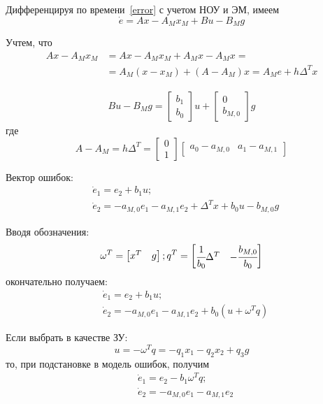 Дифференцируя по времени~\ref{error} с учетом НОУ и ЭМ, имеем 
\begin{equation}
	\dot e = Ax - A_{M} x_{M} + B u - B_{M} g
\end{equation}

Учтем, что
\begin{align}
	Ax - A_{M} x_{M} &= Ax - A_{M} x_{M} + A_{M} x - A_{M} x =\\&= A_{M} (x - x_{M}) + (A-A_{M}) x = A_{M} e + h \Delta^T x
\end{align}

\begin{align}
	B u - B_{M} g =
	\begin{bmatrix}
		b_1\\
		b_0
	\end{bmatrix}
	u + 
	\begin{bmatrix}
		0\\
		b_{M,0}
	\end{bmatrix}
	g
\end{align}
где 
\begin{equation}
A - A_{M} = h \Delta^T = 
\begin{bmatrix}
0\\
1
\end{bmatrix}
\begin{bmatrix}
a_0 - a_{M,0} & a_1 - a_{M,1}
\end{bmatrix}
\end{equation}

Вектор ошибок:
\begin{align}
	&\dot e_1 = e_2 + b_1 u;\\
	&\dot e_2 = -a_{M,0} e_1 - a_{M,1} e_2 + \Delta^T x + b_0 u - b_{M, 0} g 
\end{align}

Вводя обозначения:
\begin{align}
	\omega^T = 
	\begin{bmatrix}
		x^T & g
	\end{bmatrix};
	q^T = 
	\begin{bmatrix}
	\cfrac{1}{b_0} \Delta^T & -\cfrac{b_{M,0}}{b_0}
	\end{bmatrix}
\end{align}
окончательно получаем:
\begin{align}\label{typ_error}
	&\dot e_1 = e_2 + b_1 u;\\
	&\dot e_2 = -a_{M,0} e_1 - a_{M,1} e_2 + b_0 (u + \omega^T q)
\end{align}

Если выбрать в качестве ЗУ:
\begin{equation}\label{cl}
	u = - \omega^T q = - {q}_1 x_1  - {q}_2 x_2 +  {q}_3 g
\end{equation}
то, при подстановке в модель ошибок, получим 
\begin{align}
	&\dot e_1 = e_2 - b_1 \omega^T q;\\
	&\dot e_2 = -a_{M,0} e_1 - a_{M,1} e_2
\end{align}


